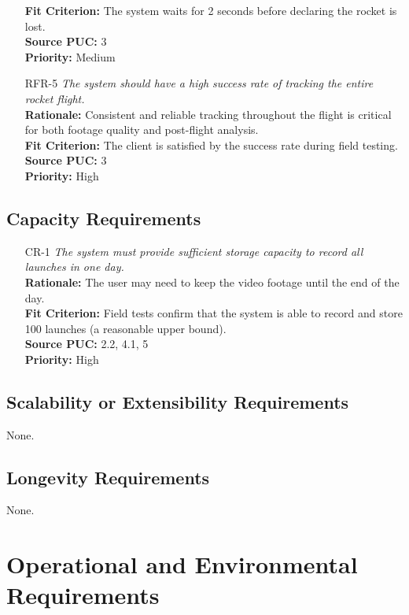\documentclass[12pt]{article}
\begin{document}
\begin{itemize}[leftmargin=*]
        \textbf{Fit Criterion:} The system waits for 2 seconds before declaring the rocket is lost.\\
        \textbf{Source PUC:} 3 \\
        \textbf{Priority:} Medium
  \item[RFR-5] \emph{The system should have a high success rate of tracking the entire
          rocket flight.}\\[2mm]
        \textbf{Rationale:} Consistent and reliable tracking throughout the flight is critical for both footage quality and post-flight analysis.\\
        \textbf{Fit Criterion:} The client is satisfied by the success rate during field testing.\\
        \textbf{Source PUC:} 3 \\
        \textbf{Priority:} High
\end{itemize}

\subsection{Capacity Requirements}
\begin{itemize}[leftmargin=*]
  \item[CR-1] \emph{The system must provide sufficient storage capacity to record all
          launches in one day.}\\[2mm]
        \textbf{Rationale:} The user may need to keep the video footage until the end of the day.\\
        \textbf{Fit Criterion:} Field tests confirm that the system is able to record and store 100 launches (a reasonable upper bound).\\
        \textbf{Source PUC:} 2.2, 4.1, 5 \\
        \textbf{Priority:} High
\end{itemize}

\subsection{Scalability or Extensibility Requirements}

None.

\subsection{Longevity Requirements}

None.

\section{Operational and Environmental Requirements}
\end{document}
